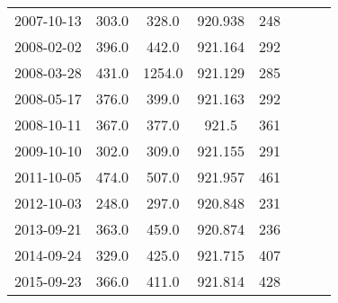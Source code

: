 \documentclass[12pt,letterpaper]{article}
\begin{document}
\begin{longtable}{cccccccc}
	2007-10-13 & 303.0 & 328.0 & 920.938 & 248 &  &  &  \\
	2008-02-02 & 396.0 & 442.0 & 921.164 & 292 &  & {\checkmark} &  \\
	2008-03-28 & 431.0 & 1254.0 & 921.129 & 285 &  & {\checkmark} & {\checkmark} \\
	2008-05-17 & 376.0 & 399.0 & 921.163 & 292 &  &  & {\checkmark} \\
	2008-10-11 & 367.0 & 377.0 & 921.5 & 361 &  &  & {\checkmark} \\
	2009-10-10 & 302.0 & 309.0 & 921.155 & 291 &  &  &  \\
	2011-10-05 & 474.0 & 507.0 & 921.957 & 461 &  &  & {\checkmark} \\
	2012-10-03 & 248.0 & 297.0 & 920.848 & 231 &  &  & {\checkmark} \\
	2013-09-21 & 363.0 & 459.0 & 920.874 & 236 &  &  & {\checkmark} \\
	2014-09-24 & 329.0 & 425.0 & 921.715 & 407 &  &  & {\checkmark} \\
	2015-09-23 & 366.0 & 411.0 & 921.814 & 428 &  &  & {\checkmark} \\
\end{longtable} 
\end{document}
